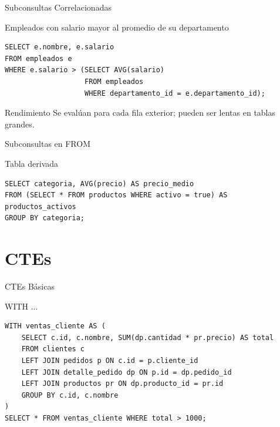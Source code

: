 \documentclass[aspectratio=169, 10pt, xcolor=table]{beamer}
\begin{document}
\begin{frame}[fragile]{Subconsultas Correlacionadas}
    \begin{block}{Empleados con salario mayor al promedio de su departamento}
        \begin{lstlisting}
SELECT e.nombre, e.salario
FROM empleados e
WHERE e.salario > (SELECT AVG(salario)
                   FROM empleados
                   WHERE departamento_id = e.departamento_id);
        \end{lstlisting}
    \end{block}
    \begin{alertblock}{Rendimiento}
        Se evalúan para cada fila exterior; pueden ser lentas en tablas grandes.
    \end{alertblock}
\end{frame}

\begin{frame}[fragile]{Subconsultas en FROM}
    \begin{block}{Tabla derivada}
        \begin{lstlisting}
SELECT categoria, AVG(precio) AS precio_medio
FROM (SELECT * FROM productos WHERE activo = true) AS productos_activos
GROUP BY categoria;
        \end{lstlisting}
    \end{block}
\end{frame}

\section{CTEs}

\begin{frame}[fragile]{CTEs Básicas}
    \begin{block}{WITH ...}
        \begin{lstlisting}
WITH ventas_cliente AS (
    SELECT c.id, c.nombre, SUM(dp.cantidad * pr.precio) AS total
    FROM clientes c
    LEFT JOIN pedidos p ON c.id = p.cliente_id
    LEFT JOIN detalle_pedido dp ON p.id = dp.pedido_id
    LEFT JOIN productos pr ON dp.producto_id = pr.id
    GROUP BY c.id, c.nombre
)
SELECT * FROM ventas_cliente WHERE total > 1000;
        \end{lstlisting}
    \end{block}
\end{frame}
\end{document}

